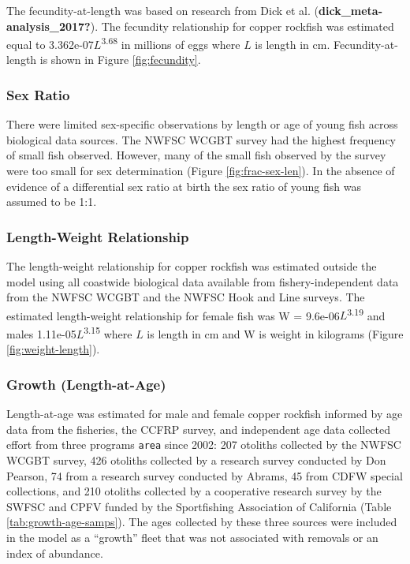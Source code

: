 \documentclass[11pt,
  english,
  letterpaper,
]{article}
\begin{document}
The fecundity-at-length was based on research from Dick et al. (\textbf{dick\_meta-analysis\_2017?}). The fecundity relationship for copper rockfish was estimated equal to 3.362e-07\(L\)\textsuperscript{3.68} in millions of eggs where \(L\) is length in cm. Fecundity-at-length is shown in Figure \ref{fig:fecundity}.

\hypertarget{sex-ratio}{%
\subsubsection{Sex Ratio}\label{sex-ratio}}

There were limited sex-specific observations by length or age of young fish across biological data sources. The NWFSC WCGBT survey had the highest frequency of small fish observed. However, many of the small fish observed by the survey were too small for sex determination (Figure \ref{fig:frac-sex-len}). In the absence of evidence of a differential sex ratio at birth the sex ratio of young fish was assumed to be 1:1.

\hypertarget{length-weight-relationship}{%
\subsubsection{Length-Weight Relationship}\label{length-weight-relationship}}

The length-weight relationship for copper rockfish was estimated outside the model using all coastwide biological data available from fishery-independent data from the NWFSC WCGBT and the NWFSC Hook and Line surveys. The estimated length-weight relationship for female fish was W = 9.6e-06\(L\)\textsuperscript{3.19} and males 1.11e-05\(L\)\textsuperscript{3.15} where \(L\) is length in cm and W is weight in kilograms (Figure \ref{fig:weight-length}).

\hypertarget{length-at-age}{%
\subsubsection{Growth (Length-at-Age)}\label{length-at-age}}

Length-at-age was estimated for male and female copper rockfish informed by age data from the fisheries, the CCFRP survey, and independent age data collected effort from three programs \texttt{area} since 2002: 207 otoliths collected by the NWFSC WCGBT survey, 426 otoliths collected by a research survey conducted by Don Pearson, 74 from a research survey conducted by Abrams, 45 from CDFW special collections, and 210 otoliths collected by a cooperative research survey by the SWFSC and CPFV funded by the Sportfishing Association of California (Table \ref{tab:growth-age-samps}). The ages collected by these three sources were included in the model as a ``growth'' fleet that was not associated with removals or an index of abundance.
\end{document}
